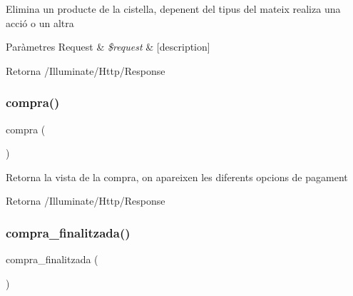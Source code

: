 Elimina un producte de la cistella, depenent del tipus del mateix realiza una acció o un altra 
\begin{DoxyParams}[1]{Paràmetres}
Request & {\em \$request} & \mbox{[}description\mbox{]} \\
\hline
\end{DoxyParams}
\begin{DoxyReturn}{Retorna}
/\+Illuminate/\+Http/\+Response 
\end{DoxyReturn}
\mbox{\label{class_app_1_1_http_1_1_controllers_1_1_home_controller_a0a64a9609854f3e21d21406463231c15}} 
\subsubsection{\texorpdfstring{compra()}{compra()}}
{\footnotesize\ttfamily compra (\begin{DoxyParamCaption}{ }\end{DoxyParamCaption})}

Retorna la vista de la compra, on apareixen les diferents opcions de pagament \begin{DoxyReturn}{Retorna}
/\+Illuminate/\+Http/\+Response 
\end{DoxyReturn}
\mbox{\label{class_app_1_1_http_1_1_controllers_1_1_home_controller_a6003d512d5ba780cfd039d1c0abae046}} 
\subsubsection{\texorpdfstring{compra\+\_\+finalitzada()}{compra\_finalitzada()}}
{\footnotesize\ttfamily compra\+\_\+finalitzada (\begin{DoxyParamCaption}{ }\end{DoxyParamCaption})}

